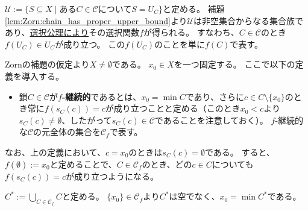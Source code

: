 ﻿\documentclass{ltjsarticle}
\theoremstyle{definition}
\begin{document}
$\mathcal{U} := \{ S \subseteq X \mid \mbox{ある$C \in \mathcal{C}$について$S = U_C$} \}$と定める。
補題\ref{lem:Zorn:chain_has_proper_upper_bound}より$\mathcal{U}$は非空集合からなる集合族であり、\underline{選択公理により}その選択関数$f$が得られる。
すなわち、$C \in \mathcal{C}$のとき$f(U_C) \in U_C$が成り立つ。
この$f(U_C)$のことを単に$f(C)$で表す。

Zornの補題の仮定より$X \neq \emptyset$である。
$x_0 \in X$を一つ固定する。
ここで以下の定義を導入する。
\begin{itemize}
    \item 
    鎖$C \in \mathcal{C}$が\textbf{$f$-継続的}であるとは、$x_0 = \min C$であり、さらに$c \in C \setminus \{x_0\}$のとき常に$f(s_C(c)) = c$が成り立つことと定める（このとき$x_0 < c$より$s_C(c) \neq \emptyset$、したがって$s_C(c) \in \mathcal{C}$であることを注意しておく）。
    $f$-継続的な$\mathcal{C}$の元全体の集合を$\mathcal{C}_f$で表す。
\end{itemize}
なお、上の定義において、$c = x_0$のときは$s_C(c) = \emptyset$である。
すると、$f(\emptyset) := x_0$と定めることで、$C \in \mathcal{C}_f$のとき、どの$c \in C$についても$f(s_C(c)) = c$が成り立つようになる。

$C^* := \bigcup_{C \in \mathcal{C}_f} C$と定める。
$\{x_0\} \in \mathcal{C}_f$より$C^*$は空でなく、$x_0 = \min C^*$である。
\end{document}

